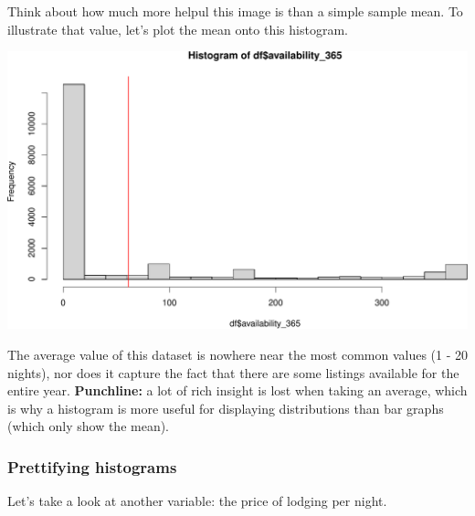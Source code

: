 \documentclass[
]{book}
\newenvironment{Shaded}{\begin{snugshade}}{\end{snugshade}}
\newcommand{\DataTypeTok}[1]{\textcolor[rgb]{0.13,0.29,0.53}{#1}}
\newcommand{\DecValTok}[1]{\textcolor[rgb]{0.00,0.00,0.81}{#1}}
\newcommand{\KeywordTok}[1]{\textcolor[rgb]{0.13,0.29,0.53}{\textbf{#1}}}
\newcommand{\NormalTok}[1]{#1}
\newcommand{\OperatorTok}[1]{\textcolor[rgb]{0.81,0.36,0.00}{\textbf{#1}}}
\newcommand{\StringTok}[1]{\textcolor[rgb]{0.31,0.60,0.02}{#1}}
\begin{document}
Think about how much more helpul this image is than a simple sample mean. To illustrate that value, let's plot the mean onto this histogram.

\begin{Shaded}
\end{Shaded}

\includegraphics{figures/unnamed-chunk-212-1.pdf}

The average value of this dataset is nowhere near the most common values (1 - 20 nights), nor does it capture the fact that there are some listings available for the entire year. \textbf{Punchline:} a lot of rich insight is lost when taking an average, which is why a histogram is more useful for displaying distributions than bar graphs (which only show the mean).

\hypertarget{prettifying-histograms}{%
\subsubsection*{Prettifying histograms}\label{prettifying-histograms}}

Let's take a look at another variable: the price of lodging per night.

\begin{Shaded}
\end{Shaded}
\end{document}
